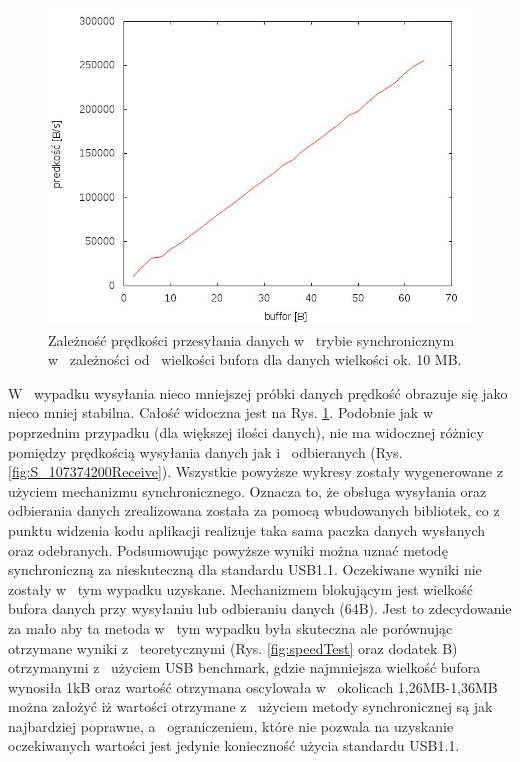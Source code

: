 \documentclass{BscUS}
\begin{document}
\begin{figure}[H]
{
\centering
\captionsetup{justification=centering}
\includegraphics[width=1\textwidth]{./img/S_10737420Receive}
\caption{Zależność prędkości przesyłania danych w~ trybie synchronicznym w~ zależności od~ wielkości bufora dla danych wielkości ok. 10 MB.}
\label{fig:S_10737420Receive}
}
\end{figure}
\noindent W~ wypadku wysyłania nieco mniejszej próbki danych prędkość obrazuje się jako nieco mniej stabilna. Całość widoczna jest na Rys. \ref{fig:S_10737420Receive}. Podobnie jak w~ poprzednim przypadku (dla większej ilości danych), nie ma widocznej różnicy pomiędzy prędkością wysyłania danych jak i~ odbieranych (Rys. \ref{fig:S_107374200Receive}).
\newline
\indent Wszystkie powyższe wykresy zostały wygenerowane z~ użyciem mechanizmu synchronicznego. Oznacza to, że obsługa wysyłania oraz odbierania danych zrealizowana została za pomocą wbudowanych bibliotek, co z~ punktu widzenia kodu aplikacji  realizuje taka sama paczka danych wysłanych oraz odebranych. Podsumowując powyższe wyniki można uznać metodę synchroniczną za nieskuteczną dla standardu USB1.1. Oczekiwane wyniki nie zostały w~ tym wypadku uzyskane. Mechanizmem blokującym jest wielkość bufora danych przy wysyłaniu lub odbieraniu danych (64B). Jest to zdecydowanie za mało aby ta metoda w~ tym wypadku była skuteczna ale porównując otrzymane wyniki z~ teoretycznymi (Rys. \ref{fig:speedTest} oraz dodatek B) otrzymanymi z~ użyciem USB benchmark, gdzie najmniejsza wielkość bufora wynosiła 1kB oraz wartość otrzymana oscylowała w~ okolicach 1,26MB-1,36MB można założyć iż wartości otrzymane z~ użyciem metody synchronicznej są jak najbardziej poprawne, a~ ograniczeniem, które nie pozwala na uzyskanie oczekiwanych wartości jest jedynie konieczność użycia standardu USB1.1.
\end{document}
